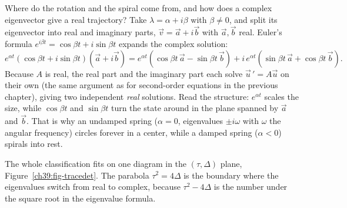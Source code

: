 \begin{whybox}
Where do the rotation and the spiral come from, and how does a complex
eigenvector give a real trajectory? Take $\lambda = \alpha + i\beta$ with
$\beta\neq 0$, and split its eigenvector into real and imaginary parts,
$\vec v = \vec a + i\vec b$ with $\vec a, \vec b$ real. Euler's formula
$e^{i\beta t} = \cos\beta t + i\sin\beta t$ expands the complex solution:
\[
  e^{\alpha t}(\cos\beta t + i\sin\beta t)(\vec a + i\vec b)
  = e^{\alpha t}(\cos\beta t\,\vec a - \sin\beta t\,\vec b)
    + i\,e^{\alpha t}(\sin\beta t\,\vec a + \cos\beta t\,\vec b).
\]
Because $A$ is real, the real part and the imaginary part each solve
$\vec u\,' = A\vec u$ on their own (the same argument as for second-order
equations in the previous chapter), giving two independent \emph{real} solutions. Read the
structure: $e^{\alpha t}$ scales the size, while $\cos\beta t$ and $\sin\beta t$
turn the state around in the plane spanned by $\vec a$ and $\vec b$. That is why an
undamped spring ($\alpha = 0$, eigenvalues $\pm i\omega$ with $\omega$ the
angular frequency) circles forever in a
center, while a damped spring ($\alpha < 0$) spirals into rest.
\end{whybox}

The whole classification fits on one diagram in the $(\tau, \Delta)$ plane,
Figure~\ref{ch39:fig-tracedet}. The
parabola $\tau^2 = 4\Delta$ is the boundary where the eigenvalues switch from
real to complex, because $\tau^2-4\Delta$ is the number under the square root
in the eigenvalue formula.

